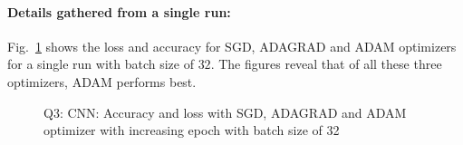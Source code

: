 \paragraph{Details gathered from a single run:} Fig.~\ref{fig:q3_loss_acc_32} shows the loss and accuracy for SGD, ADAGRAD and ADAM optimizers for a single run with batch size of $32$. The figures reveal that of all these three optimizers, ADAM performs best.
\begin{figure}[!h]
	\centering
	\hspace{0.5cm}
	\hspace{0.5cm}
	\caption{Q3: CNN: Accuracy and loss with SGD, ADAGRAD and ADAM optimizer with increasing epoch with batch size of 32}
	\label{fig:q3_loss_acc_32}
\end{figure}
